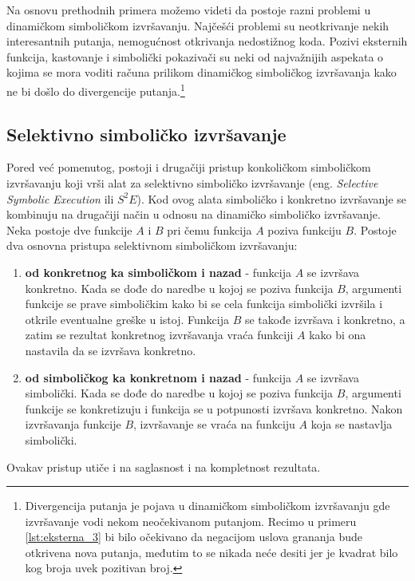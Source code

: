 \documentclass[12pt,oneside]{memoir}
\begin{document}
Na osnovu prethodnih primera možemo videti da postoje razni problemi u dinamičkom simboličkom izvršavanju. Najčešći problemi su neotkrivanje nekih interesantnih putanja, nemogućnost otkrivanja nedostižnog koda. Pozivi eksternih funkcija, kastovanje i simbolički pokazivači su neki od najvažnijih aspekata o kojima se mora voditi računa prilikom dinamičkog simboličkog izvršavanja kako ne bi došlo do divergencije putanja.\footnote[3]{Divergencija putanja je pojava u dinamičkom simboličkom izvršavanju gde izvršavanje vodi nekom neočekivanom putanjom. Recimo u primeru \ref{lst:eksterna_3} bi bilo očekivano da negacijom uslova grananja bude otkrivena nova putanja, međutim to se nikada neće desiti jer je kvadrat bilo kog broja uvek pozitivan broj.}

\subsection{Selektivno simboličko izvršavanje}
Pored već pomenutog, postoji i drugačiji pristup konkoličkom simboličkom izvršavanju koji vrši alat za selektivno simboličko izvršavanje (eng. \textit{Selective Symbolic Execution} ili $S^2E$). Kod ovog alata simboličko i konkretno izvršavanje se kombinuju na drugačiji način u odnosu na dinamičko simboličko izvršavanje. Neka postoje dve funkcije $A$ i $B$ pri čemu funkcija $A$ poziva funkciju $B$.
Postoje dva osnovna pristupa selektivnom simboličkom izvršavanju:
\begin{enumerate}
    \item \textbf{od konkretnog ka simboličkom i nazad} - funkcija $A$ se izvršava konkretno. Kada se dođe do naredbe u kojoj se poziva funkcija $B$, argumenti funkcije se prave simboličkim kako bi se cela funkcija simbolički izvršila i otkrile eventualne greške u istoj. Funkcija $B$ se takođe izvršava i konkretno, a zatim se rezultat konkretnog izvršavanja vraća funkciji $A$ kako bi ona nastavila da se izvršava konkretno.
    
    \item \textbf{od simboličkog ka konkretnom i nazad} - funkcija $A$ se izvršava simbolički. Kada se dođe do naredbe u kojoj se poziva funkcija $B$, argumenti funkcije se konkretizuju i funkcija se u potpunosti izvršava konkretno. Nakon izvršavanja funkcije $B$, izvršavanje se vraća na funkciju $A$ koja se nastavlja simbolički.
\end{enumerate}

Ovakav pristup utiče i na saglasnost i na kompletnost rezultata.
\end{document}
